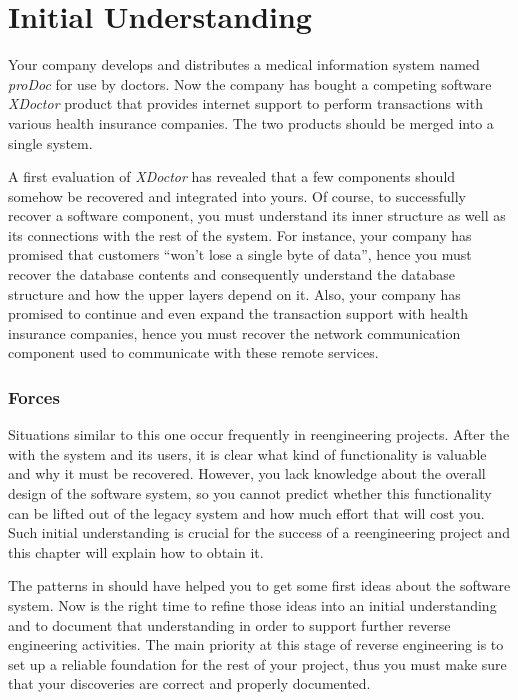 \documentclass[a4paper,10pt,twoside]{book}
\begin{document}
	\renewcommand{\nnbb}[2]{} %
	\sloppy
\fi
\chapter{Initial Understanding}

Your company develops and distributes a medical information system named \emph{proDoc} for 
use by doctors. Now the company has bought a competing software \emph{XDoctor} product that 
provides internet support to perform transactions with various health insurance companies. 
The two products should be merged into a single system.

A first evaluation of \emph{XDoctor} has revealed that a few components should somehow be 
recovered and integrated into yours. Of course, to successfully recover a software 
component, you must understand its inner structure as well as its connections with the rest 
of the system. For instance, your company has promised that customers ``won't lose a single 
byte of data'', hence you must recover the database contents and consequently understand 
the database structure and how the upper layers depend on it. Also, your company has 
promised to continue and even expand the transaction support with health insurance 
companies, hence you must recover the network communication component used to communicate 
with these remote services.

\subsection*{Forces}

Situations similar to this one occur frequently in reengineering projects. After the 
 with the system and its users, it is clear what kind 
of functionality is valuable and why it must be recovered. However, you lack knowledge 
about the overall design of the software system, so you cannot predict whether this 
functionality can be lifted out of the legacy system and how much effort that will cost 
you. Such initial understanding is crucial for the success of a reengineering project and 
this chapter will explain how to obtain it.

The patterns in  should have helped you to get some 
first ideas about the software system. Now is the right time to refine those ideas into an 
initial understanding and to document that understanding in order to support further 
reverse engineering activities. The main priority at this stage of reverse engineering is 
to set up a reliable foundation for the rest of your project, thus you must make sure that 
your discoveries are correct and properly documented.
\end{document}
